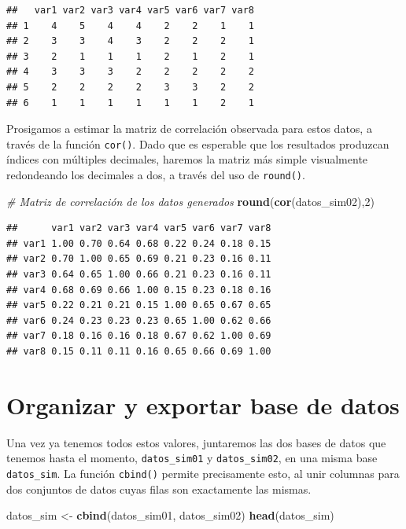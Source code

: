 \documentclass[
]{book}
\newenvironment{Shaded}{\begin{snugshade}}{\end{snugshade}}
\newcommand{\CommentTok}[1]{\textcolor[rgb]{0.56,0.35,0.01}{\textit{#1}}}
\newcommand{\DecValTok}[1]{\textcolor[rgb]{0.00,0.00,0.81}{#1}}
\newcommand{\FunctionTok}[1]{\textcolor[rgb]{0.13,0.29,0.53}{\textbf{#1}}}
\newcommand{\NormalTok}[1]{#1}
\newcommand{\OtherTok}[1]{\textcolor[rgb]{0.56,0.35,0.01}{#1}}
\begin{document}
\begin{verbatim}
##   var1 var2 var3 var4 var5 var6 var7 var8
## 1    4    5    4    4    2    2    1    1
## 2    3    3    4    3    2    2    2    1
## 3    2    1    1    1    2    1    2    1
## 4    3    3    3    2    2    2    2    2
## 5    2    2    2    2    3    3    2    2
## 6    1    1    1    1    1    1    2    1
\end{verbatim}

Prosigamos a estimar la matriz de correlación observada para estos datos, a través de la función \texttt{cor()}. Dado que es esperable que los resultados produzcan índices con múltiples decimales, haremos la matriz más simple visualmente redondeando los decimales a dos, a través del uso de \texttt{round()}.

\begin{Shaded}
\begin{Highlighting}[]
\CommentTok{\# Matriz de correlación de los datos generados}
\FunctionTok{round}\NormalTok{(}\FunctionTok{cor}\NormalTok{(datos\_sim02),}\DecValTok{2}\NormalTok{)}
\end{Highlighting}
\end{Shaded}

\begin{verbatim}
##      var1 var2 var3 var4 var5 var6 var7 var8
## var1 1.00 0.70 0.64 0.68 0.22 0.24 0.18 0.15
## var2 0.70 1.00 0.65 0.69 0.21 0.23 0.16 0.11
## var3 0.64 0.65 1.00 0.66 0.21 0.23 0.16 0.11
## var4 0.68 0.69 0.66 1.00 0.15 0.23 0.18 0.16
## var5 0.22 0.21 0.21 0.15 1.00 0.65 0.67 0.65
## var6 0.24 0.23 0.23 0.23 0.65 1.00 0.62 0.66
## var7 0.18 0.16 0.16 0.18 0.67 0.62 1.00 0.69
## var8 0.15 0.11 0.11 0.16 0.65 0.66 0.69 1.00
\end{verbatim}

\section{Organizar y exportar base de datos}\label{organizar-y-exportar-base-de-datos}

Una vez ya tenemos todos estos valores, juntaremos las dos bases de datos que tenemos hasta el momento, \texttt{datos\_sim01} y \texttt{datos\_sim02}, en una misma base \texttt{datos\_sim}. La función \texttt{cbind()} permite precisamente esto, al unir columnas para dos conjuntos de datos cuyas filas son exactamente las mismas.

\begin{Shaded}
\begin{Highlighting}[]
\NormalTok{datos\_sim }\OtherTok{\textless{}{-}} \FunctionTok{cbind}\NormalTok{(datos\_sim01, datos\_sim02)  }
\FunctionTok{head}\NormalTok{(datos\_sim)}
\end{Highlighting}
\end{Shaded}
\end{document}
